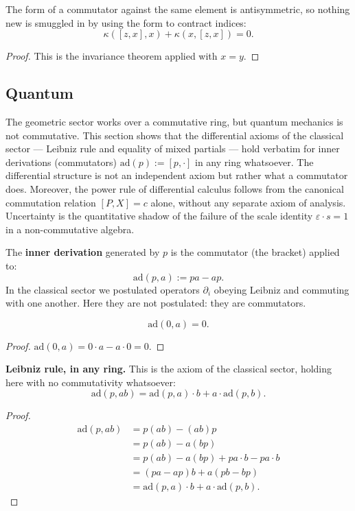 \begin{theorem}
The form of a commutator against the same element is antisymmetric, so nothing new is smuggled in by using the form to contract indices:
\[
\kappa([z, x], x) + \kappa(x, [z, x]) = 0.
\]
\begin{proof}
This is the invariance theorem applied with $x = y$.
\end{proof}
\end{theorem}

\subsection{Quantum}

The geometric sector works over a commutative ring, but quantum mechanics is not commutative. This section shows that the differential axioms of the classical sector — Leibniz rule and equality of mixed partials — hold verbatim for inner derivations (commutators) $\text{ad}(p) := [p, \cdot]$ in any ring whatsoever. The differential structure is not an independent axiom but rather what a commutator does. Moreover, the power rule of differential calculus follows from the canonical commutation relation $[P, X] = c$ alone, without any separate axiom of analysis. Uncertainty is the quantitative shadow of the failure of the scale identity $\varepsilon \cdot s = 1$ in a non-commutative algebra.

\begin{definition}
The \textbf{inner derivation} generated by $p$ is the commutator (the bracket) applied to:
\[
\text{ad}(p, a) := pa - ap.
\]
In the classical sector we postulated operators $\partial_i$ obeying Leibniz and commuting with one another. Here they are not postulated: they are commutators.
\end{definition}

\begin{theorem}
\[
\text{ad}(0, a) = 0.
\]
\begin{proof}
$\text{ad}(0, a) = 0 \cdot a - a \cdot 0 = 0$.
\end{proof}
\end{theorem}

\begin{theorem}
\textbf{Leibniz rule, in any ring.} This is the axiom of the classical sector, holding here with no commutativity whatsoever:
\[
\text{ad}(p, ab) = \text{ad}(p, a) \cdot b + a \cdot \text{ad}(p, b).
\]
\begin{proof}
\begin{align*}
\text{ad}(p, ab) &= p(ab) - (ab)p\\
&= p(ab) - a(bp)\\
&= p(ab) - a(bp) + pa \cdot b - pa \cdot b\\
&= (pa - ap) b + a(pb - bp)\\
&= \text{ad}(p, a) \cdot b + a \cdot \text{ad}(p, b).
\end{align*}
\end{proof}
\end{theorem}

